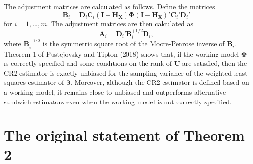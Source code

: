 \documentclass[12pt]{article}
\begin{document}
The adjustment matrices are calculated as follows. Define the matrices
\begin{equation}
\label{eq:B-matrix}
\mathbf{B}_i = \mathbf{D}_i \mathbf{C}_i \left(\mathbf{I} - \mathbf{H}_{\mathbf{X}}\right) \boldsymbol\Phi \left(\mathbf{I} - \mathbf{H}_{\mathbf{X}}\right)'\mathbf{C}_i' \mathbf{D}_i'
\end{equation} for \(i = 1,...,m\). The adjustment matrices are then
calculated as \begin{equation}
\label{eq:A-matrix}
\mathbf{A}_i = \mathbf{D}_i' \mathbf{B}_i^{+1/2} \mathbf{D}_i,
\end{equation} where \(\mathbf{B}_i^{+1/2}\) is the symmetric square
root of the Moore-Penrose inverse of \(\mathbf{B}_i\). Theorem 1 of
Pustejovsky and Tipton (2018) shows that, if the working model
\(\boldsymbol\Phi\) is correctly specified and some conditions on the
rank of \(\mathbf{U}\) are satisfied, then the CR2 estimator is exactly
unbiased for the sampling variance of the weighted least squares
estimator of \(\boldsymbol\beta\). Moreover, although the CR2 estimator
is defined based on a working model, it remains close to unbiased and
outperforms alternative sandwich estimators even when the working model
is not correctly specified.

\hypertarget{the-original-statement-of-theorem-2}{%
\section{The original statement of Theorem
2}\label{the-original-statement-of-theorem-2}}
\end{document}
